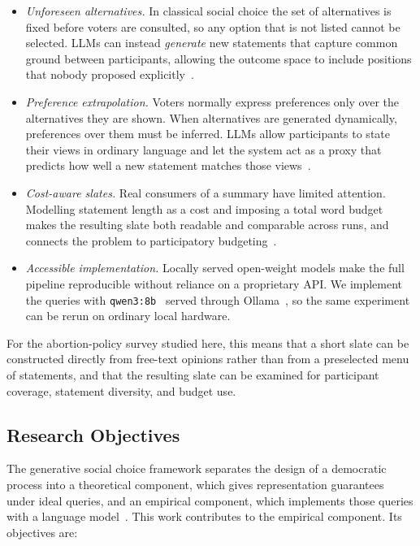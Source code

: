 \documentclass[letterpaper,11pt]{article}
\theoremstyle{plain}
\theoremstyle{definition}
\begin{document}
\begin{itemize}
\item \textit{Unforeseen alternatives.}
In classical social choice the set of alternatives is fixed before voters are consulted, so any option that is not listed cannot be selected. LLMs can instead \emph{generate} new statements that capture common ground between participants, allowing the outcome space to include positions that nobody proposed explicitly~\citep{fish2026gsc,boehmer2025nextgen}. \smallskip

\item \textit{Preference extrapolation.}
Voters normally express preferences only over the alternatives they are shown. When alternatives are generated dynamically, preferences over them must be inferred. LLMs allow participants to state their views in ordinary language and let the system act as a proxy that predicts how well a new statement matches those views~\citep{fish2026gsc}. \smallskip

\item \textit{Cost-aware slates.}
Real consumers of a summary have limited attention. Modelling statement length as a cost and imposing a total word budget makes the resulting slate both readable and comparable across runs, and connects the problem to participatory budgeting~\citep{boehmer2025nextgen}. \smallskip

\item \textit{Accessible implementation.}
Locally served open-weight models make the full pipeline reproducible without reliance on a proprietary API. We implement the queries with \texttt{qwen3:8b}~\citep{yang2025qwen3} served through Ollama~\citep{ollama2026}, so the same experiment can be rerun on ordinary local hardware.
\end{itemize}

For the abortion-policy survey studied here, this means that a short slate can be constructed directly from free-text opinions rather than from a preselected menu of statements, and that the resulting slate can be examined for participant coverage, statement diversity, and budget use.


\subsection{Research Objectives}

The generative social choice framework separates the design of a democratic process into a theoretical component, which gives representation guarantees under ideal queries, and an empirical component, which implements those queries with a language model~\citep{fish2026gsc}. This work contributes to the empirical component. Its objectives are: \smallskip
\end{document}
